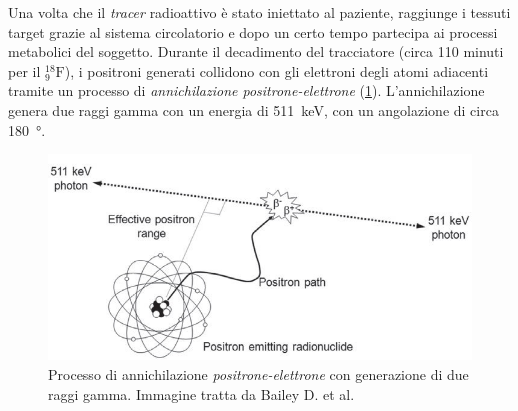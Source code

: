 Una volta che il \textit{tracer} radioattivo è stato iniettato al paziente, raggiunge i tessuti target grazie al sistema circolatorio e dopo un certo tempo partecipa ai processi metabolici del soggetto. Durante il decadimento del tracciatore (circa 110 minuti per il $^{18}_9\text{F}$), i positroni generati collidono con gli elettroni degli atomi adiacenti tramite un processo di \textit{annichilazione positrone-elettrone} (\Fig\ref{fig:annihilation}). L'annichilazione genera due raggi gamma con un energia di \SI{511}{\kilo\electronvolt}, con un angolazione di circa \SI{180}{\degree}.
\begin{figure}[h]
	\centering
	\includegraphics[width=0.8\linewidth]{./ImageFiles/annihilation}
	\caption{Processo di annichilazione \textit{positrone-elettrone} con generazione di due raggi gamma. Immagine tratta da Bailey D. et al\cite{Bailey2014}.}
	\label{fig:annihilation}
\end{figure}
